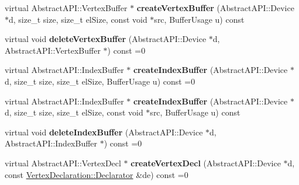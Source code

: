 \begin{DoxyCompactItemize}
\item 
\hypertarget{class_tempest_1_1_abstract_a_p_i_a798d51e0cc29fbe75bc129b56bfa8f98}{virtual Abstract\+A\+P\+I\+::\+Vertex\+Buffer $\ast$ {\bfseries create\+Vertex\+Buffer} (Abstract\+A\+P\+I\+::\+Device $\ast$d, size\+\_\+t size, size\+\_\+t el\+Size, const void $\ast$src, Buffer\+Usage u) const }\label{class_tempest_1_1_abstract_a_p_i_a798d51e0cc29fbe75bc129b56bfa8f98}

\item 
\hypertarget{class_tempest_1_1_abstract_a_p_i_ae7a9f0e429269d59bba0d477af0f16bf}{virtual void {\bfseries delete\+Vertex\+Buffer} (Abstract\+A\+P\+I\+::\+Device $\ast$d, Abstract\+A\+P\+I\+::\+Vertex\+Buffer $\ast$) const =0}\label{class_tempest_1_1_abstract_a_p_i_ae7a9f0e429269d59bba0d477af0f16bf}

\item 
\hypertarget{class_tempest_1_1_abstract_a_p_i_a05d72cb753661c3ebdc77f5c96207f31}{virtual Abstract\+A\+P\+I\+::\+Index\+Buffer $\ast$ {\bfseries create\+Index\+Buffer} (Abstract\+A\+P\+I\+::\+Device $\ast$d, size\+\_\+t size, size\+\_\+t el\+Size, Buffer\+Usage u) const =0}\label{class_tempest_1_1_abstract_a_p_i_a05d72cb753661c3ebdc77f5c96207f31}

\item 
\hypertarget{class_tempest_1_1_abstract_a_p_i_a77337d2b7c43b5f05416dbd40c29ec14}{virtual Abstract\+A\+P\+I\+::\+Index\+Buffer $\ast$ {\bfseries create\+Index\+Buffer} (Abstract\+A\+P\+I\+::\+Device $\ast$d, size\+\_\+t size, size\+\_\+t el\+Size, const void $\ast$src, Buffer\+Usage u) const }\label{class_tempest_1_1_abstract_a_p_i_a77337d2b7c43b5f05416dbd40c29ec14}

\item 
\hypertarget{class_tempest_1_1_abstract_a_p_i_a8a92d0109a5db7f25a33bd01be7729ce}{virtual void {\bfseries delete\+Index\+Buffer} (Abstract\+A\+P\+I\+::\+Device $\ast$d, Abstract\+A\+P\+I\+::\+Index\+Buffer $\ast$) const =0}\label{class_tempest_1_1_abstract_a_p_i_a8a92d0109a5db7f25a33bd01be7729ce}

\item 
\hypertarget{class_tempest_1_1_abstract_a_p_i_a33c795515ca0bc6155a9121fc9801526}{virtual Abstract\+A\+P\+I\+::\+Vertex\+Decl $\ast$ {\bfseries create\+Vertex\+Decl} (Abstract\+A\+P\+I\+::\+Device $\ast$d, const \hyperlink{class_tempest_1_1_vertex_declaration_1_1_declarator}{Vertex\+Declaration\+::\+Declarator} \&de) const =0}\label{class_tempest_1_1_abstract_a_p_i_a33c795515ca0bc6155a9121fc9801526}


\end{DoxyCompactItemize}
